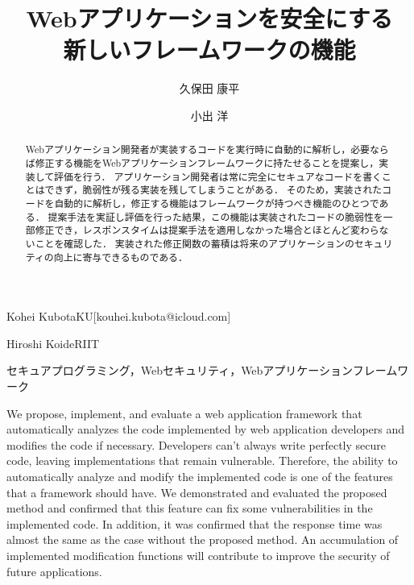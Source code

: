 \documentclass[submit]{ipsj}
\begin{document}
\title{Webアプリケーションを安全にする
\\新しいフレームワークの機能}



\author{久保田 康平}{Kohei Kubota}{KU}[kouhei.kubota@icloud.com]
\author{小出 洋}{Hiroshi Koide}{RIIT}

\begin{abstract}
Webアプリケーション開発者が実装するコードを実行時に自動的に解析し，必要ならば修正する機能をWebアプリケーションフレームワークに持たせることを提案し，実装して評価を行う．
アプリケーション開発者は常に完全にセキュアなコードを書くことはできず，脆弱性が残る実装を残してしまうことがある．
そのため，実装されたコードを自動的に解析し，修正する機能はフレームワークが持つべき機能のひとつである．
提案手法を実証し評価を行った結果，この機能は実装されたコードの脆弱性を一部修正でき，レスポンスタイムは提案手法を適用しなかった場合とほとんど変わらないことを確認した．
実装された修正関数の蓄積は将来のアプリケーションのセキュリティの向上に寄与できるものである．
\end{abstract}


\begin{jkeyword}
セキュアプログラミング，Webセキュリティ，Webアプリケーションフレームワーク
\end{jkeyword}

\begin{eabstract}
We propose, implement, and evaluate a web application framework that automatically analyzes the code implemented by web application developers and modifies the code if necessary.
Developers can't always write perfectly secure code, leaving implementations that remain vulnerable.
Therefore, the ability to automatically analyze and modify the implemented code is one of the features that a framework should have.
We demonstrated and evaluated the proposed method and confirmed that this feature can fix some vulnerabilities in the implemented code.
In addition, it was confirmed that the response time was almost the same as the case without the proposed method.
An accumulation of implemented modification functions will contribute to improve the security of future applications.
\end{eabstract}
\end{document}
